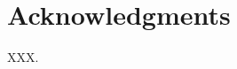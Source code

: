 \documentclass[a4paper,twoside]{article}
\begin{document}
\URRhoneAlpes
\makeRR














%
%
\section*{Acknowledgments}

XXX.

%
%
%


\end{document}
